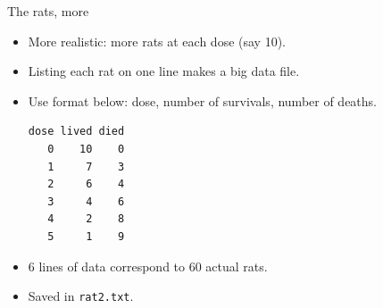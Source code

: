 \documentclass[unknownkeysallowed]{beamer}\usepackage[]{graphicx}\usepackage[]{color}
\begin{document}
\begin{frame}[fragile]{The rats, more}

  \begin{itemize}
  \item More realistic: more rats at each dose (say 10).
  \item Listing each rat on one line makes a big data file.
  \item Use format below: dose, number of survivals, number of deaths.
\begin{verbatim}
dose lived died
   0    10    0
   1     7    3 
   2     6    4 
   3     4    6 
   4     2    8 
   5     1    9  
\end{verbatim}


  \item 6 lines of data correspond to 60 actual rats.

  \item Saved in \texttt{rat2.txt}.

  \end{itemize}
  
\end{frame}
\end{document}

